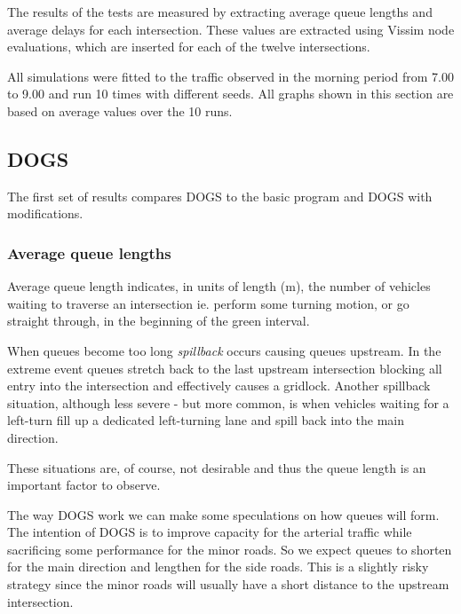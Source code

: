 The results of the tests are measured by extracting average queue lengths and average delays for each intersection. These values are extracted using Vissim node evaluations, which are inserted for each of the twelve intersections.

All simulations were fitted to the traffic observed in the morning period from 7.00 to 9.00 and run 10 times with different seeds. All graphs shown in this section are based on average values over the 10 runs.

\subsection{DOGS}
The first set of results compares DOGS to the basic program and DOGS with modifications.

\subsubsection*{Average queue lengths}
Average queue length indicates, in units of length (m), the number of vehicles waiting to traverse an intersection ie. perform some turning motion, or go straight through, in the beginning of the green interval. 

When queues become too long \textit{spillback} occurs causing queues upstream. In the extreme event queues stretch back to the last upstream intersection blocking all entry into the intersection and effectively causes a gridlock.
Another spillback situation, although less severe - but more common, is when vehicles waiting for a left-turn fill up a dedicated left-turning lane and spill back into the main direction.

These situations are, of course, not desirable and thus the queue length is an important factor to observe.

The way DOGS work we can make some speculations on how queues will form. The intention of DOGS is to improve capacity for the arterial traffic while sacrificing some performance for the minor roads. So we expect queues to shorten for the main direction and lengthen for the side roads. This is a slightly risky strategy since the minor roads will usually have a short distance to the upstream intersection.

